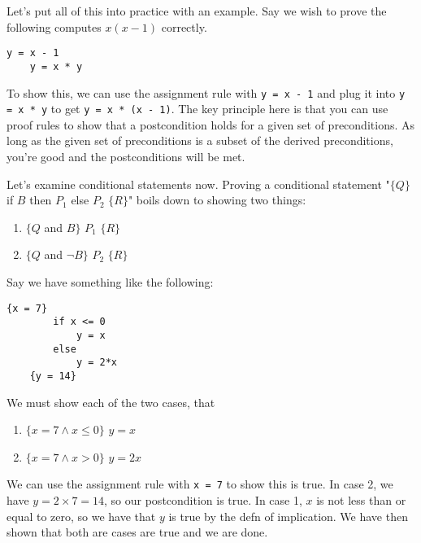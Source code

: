 \documentclass[nobib]{tufte-handout}
\begin{document}
Let's put all of this into practice with an example. Say we 
wish to prove the following computes $x(x-1)$ correctly. 
\begin{lstlisting}[caption=Assignment rule example]
    y = x - 1
    y = x * y
\end{lstlisting}
To show this, we can use the assignment rule with \texttt{y = x - 1}
and plug it into \texttt{y = x * y} to get \texttt{y = x * (x - 1)}. 
The key principle here is that you can use proof rules to show 
that a postcondition holds for a given set of preconditions. As long 
as the given set of preconditions is a subset of the derived preconditions, 
you're good and the postconditions will be met. 

Let's examine conditional statements now. 
Proving a conditional statement "$\{Q\}$ if $B$ then $P_1$ else $P_2$ $\{R\}$"
boils down to showing two things:
\begin{enumerate}
    \item $\{Q$ and $B\}$ $P_1$ $\{R\}$
    \item $\{Q$ and $\neg B\}$ $P_2$ $\{R\}$
\end{enumerate}
Say we have something like the following:
\begin{lstlisting}[caption=Example]
    {x = 7}
        if x <= 0 
            y = x
        else
            y = 2*x 
    {y = 14}
\end{lstlisting}
We must show each of the two cases, that 
\begin{enumerate}
    \item $\{x = 7 \land x \leq 0\}$ $y = x$ 
    \item  $\{x = 7 \land x > 0\}$ $y = 2x$ 
\end{enumerate}
We can use the assignment rule with \texttt{x = 7} to show this is true. 
In case 2, we have \texttt{$y = 2\times7 = 14$}, so our postcondition is true. In case 1, 
$x$ is not less than or equal to zero, so we have that $y$ is true by the defn of implication. We 
have then shown that both are cases are true and we are done. 
\end{document}

